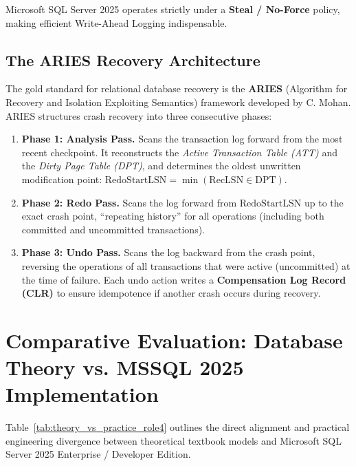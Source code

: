 Microsoft SQL Server 2025 operates strictly under a \textbf{Steal / No-Force} policy, making efficient Write-Ahead Logging indispensable.

\subsection{The ARIES Recovery Architecture}
The gold standard for relational database recovery is the \textbf{ARIES} (Algorithm for Recovery and Isolation Exploiting Semantics) framework developed by C. Mohan. ARIES structures crash recovery into three consecutive phases:
\begin{enumerate}
    \item \textbf{Phase 1: Analysis Pass.} Scans the transaction log forward from the most recent checkpoint. It reconstructs the \textit{Active Transaction Table (ATT)} and the \textit{Dirty Page Table (DPT)}, and determines the oldest unwritten modification point: $\mathrm{RedoStartLSN} = \min(\mathrm{RecLSN} \in \mathrm{DPT})$.
    \item \textbf{Phase 2: Redo Pass.} Scans the log forward from $\mathrm{RedoStartLSN}$ up to the exact crash point, ``repeating history'' for all operations (including both committed and uncommitted transactions).
    \item \textbf{Phase 3: Undo Pass.} Scans the log backward from the crash point, reversing the operations of all transactions that were active (uncommitted) at the time of failure. Each undo action writes a \textbf{Compensation Log Record (CLR)} to ensure idempotence if another crash occurs during recovery.
\end{enumerate}

\section{Comparative Evaluation: Database Theory vs. MSSQL 2025 Implementation}
Table~\ref{tab:theory_vs_practice_role4} outlines the direct alignment and practical engineering divergence between theoretical textbook models and Microsoft SQL Server 2025 Enterprise / Developer Edition.


